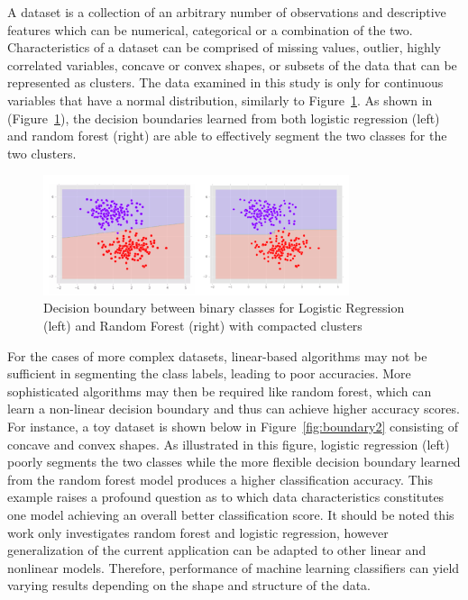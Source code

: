 \documentclass{llncs}
\begin{document}
A dataset is a collection of an arbitrary number of observations and descriptive features which can be numerical, categorical or a combination of the two. Characteristics of a dataset can be comprised of missing values, outlier, highly correlated variables, concave or convex shapes, or subsets of the data that can be represented as clusters. The data examined in this study is only for continuous variables that have a normal distribution, similarly to Figure~\ref{fig:boundary1}. As shown in (Figure~\ref{fig:boundary1}), the decision boundaries learned from both logistic regression (left) and random forest (right) are able to effectively segment the two classes for the two clusters.

\begin{figure}
\centering
\includegraphics[width=0.8\textwidth]{decisionboundary.png}
\caption{Decision boundary between binary classes for Logistic Regression (left) and Random Forest (right) with compacted clusters}
\label{fig:boundary1}
\end{figure}

 
For the cases of more complex datasets, linear-based algorithms may not be sufficient in segmenting the class labels, leading to poor accuracies. More sophisticated algorithms may then be required like random forest, which can learn a non-linear decision boundary and thus can achieve higher accuracy scores. For instance, a toy dataset is shown below in Figure~\ref{fig:boundary2} consisting of concave and convex shapes. As illustrated in this figure, logistic regression (left) poorly segments the two classes while the more flexible decision boundary learned from the random forest model produces a higher classification accuracy. This example raises a profound question as to which data characteristics constitutes one model achieving an overall better classification score. It should be noted this work only investigates random forest and logistic regression, however generalization of the current application can be adapted to other linear and nonlinear models. Therefore, performance of machine learning classifiers can yield varying results depending on the shape and structure of the data.
\end{document}

